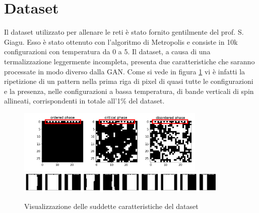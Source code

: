 \documentclass[Lau, noexaminfo, oneside]{sapthesis} %
\begin{document}
\section{Dataset}
Il dataset utilizzato per allenare le reti è stato fornito gentilmente del prof. S. Giagu. Esso è stato ottenuto con l'algoritmo di Metropolis e consiste in 10k configurazioni con temperatura da 0 a 5. Il dataset, a causa di una termalizzazione leggermente incompleta, presenta due caratteristiche che saranno processate in modo diverso dalla GAN. Come si vede in figura \ref{difetti} vi è infatti la ripetizione di un pattern nella prima riga di pixel di quasi tutte le configurazioni e la presenza, nelle configurazioni a bassa temperatura, di bande verticali di spin allineati, corrispondenti in totale all'1\% del dataset.
\begin{figure}[H]
\includegraphics[width=0.8\textwidth]{dataset.png}\\
\includegraphics[width=0.9\textwidth]{difetti.png}
\centering
\caption{Visualizzazione delle suddette caratteristiche del dataset}
\label{difetti}
\end{figure}
\end{document}
